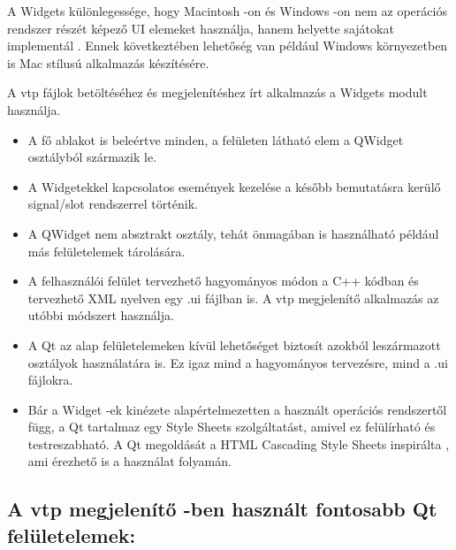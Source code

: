 A Widgets különlegessége, hogy Macintosh -on és Windows -on nem 
az operációs rendszer részét képező UI elemeket használja, 
hanem helyette sajátokat implementál \cite{qtdocumentation}. 
Ennek következtében lehetőség van például 
Windows környezetben is Mac stílusú alkalmazás készítésére.

A vtp fájlok betöltéséhez és megjelenítéshez írt 
alkalmazás a Widgets modult használja.

\vspace{3mm}


\vspace{3mm}

\begin{itemize}
\item 
A fő ablakot is beleértve minden, 
a felületen látható elem a QWidget osztályból származik le.
\item 
A Widgetekkel kapcsolatos események kezelése 
a később bemutatásra kerülő signal/slot rendszerrel történik. 
\item
A QWidget nem absztrakt osztály, 
tehát önmagában is használható például más felületelemek tárolására.
\item
A felhasználói felület tervezhető hagyományos módon
a C++ kódban
és tervezhető XML nyelven egy .ui fájlban is. 
A vtp megjelenítő alkalmazás az utóbbi módszert használja.
\item 
A Qt az alap felületelemeken kívül lehetőséget 
biztosít azokból leszármazott osztályok használatára is. 
Ez igaz mind a hagyományos tervezésre, mind a .ui fájlokra.
\item
Bár a Widget -ek kinézete alapértelmezetten 
a használt operációs rendszertől függ, 
a Qt tartalmaz egy Style Sheets szolgáltatást, 
amivel ez felülírható és testreszabható. 
A Qt megoldását 
a HTML Cascading Style Sheets inspirálta \cite{qtdocumentation}, 
ami érezhető is a használat folyamán.
\end{itemize}

\subsection{A vtp megjelenítő -ben használt fontosabb Qt felületelemek:}


